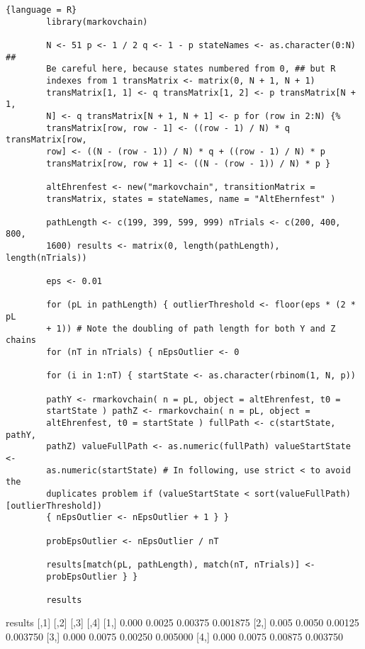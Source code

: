 \documentclass[12pt]{article}
\begin{document}
\begin{solution}

    \begin{lstlisting}{language = R}
        library(markovchain)

        N <- 51 p <- 1 / 2 q <- 1 - p stateNames <- as.character(0:N) ##
        Be careful here, because states numbered from 0, ## but R
        indexes from 1 transMatrix <- matrix(0, N + 1, N + 1)
        transMatrix[1, 1] <- q transMatrix[1, 2] <- p transMatrix[N + 1,
        N] <- q transMatrix[N + 1, N + 1] <- p for (row in 2:N) {%
        transMatrix[row, row - 1] <- ((row - 1) / N) * q transMatrix[row,
        row] <- ((N - (row - 1)) / N) * q + ((row - 1) / N) * p
        transMatrix[row, row + 1] <- ((N - (row - 1)) / N) * p }

        altEhrenfest <- new("markovchain", transitionMatrix =
        transMatrix, states = stateNames, name = "AltEhernfest" )

        pathLength <- c(199, 399, 599, 999) nTrials <- c(200, 400, 800,
        1600) results <- matrix(0, length(pathLength), length(nTrials))

        eps <- 0.01

        for (pL in pathLength) { outlierThreshold <- floor(eps * (2 * pL
        + 1)) # Note the doubling of path length for both Y and Z chains
        for (nT in nTrials) { nEpsOutlier <- 0

        for (i in 1:nT) { startState <- as.character(rbinom(1, N, p))

        pathY <- rmarkovchain( n = pL, object = altEhrenfest, t0 =
        startState ) pathZ <- rmarkovchain( n = pL, object =
        altEhrenfest, t0 = startState ) fullPath <- c(startState, pathY,
        pathZ) valueFullPath <- as.numeric(fullPath) valueStartState <-
        as.numeric(startState) # In following, use strict < to avoid the
        duplicates problem if (valueStartState < sort(valueFullPath)[outlierThreshold])
        { nEpsOutlier <- nEpsOutlier + 1 } }

        probEpsOutlier <- nEpsOutlier / nT

        results[match(pL, pathLength), match(nT, nTrials)] <-
        probEpsOutlier } }

        results
    \end{lstlisting}

\begin{verbatim*}
results
      [,1]   [,2]    [,3]     [,4]
[1,] 0.000 0.0025 0.00375 0.001875
[2,] 0.005 0.0050 0.00125 0.003750
[3,] 0.000 0.0075 0.00250 0.005000
[4,] 0.000 0.0075 0.00875 0.003750
\end{verbatim*}

\end{solution}
\end{document}
